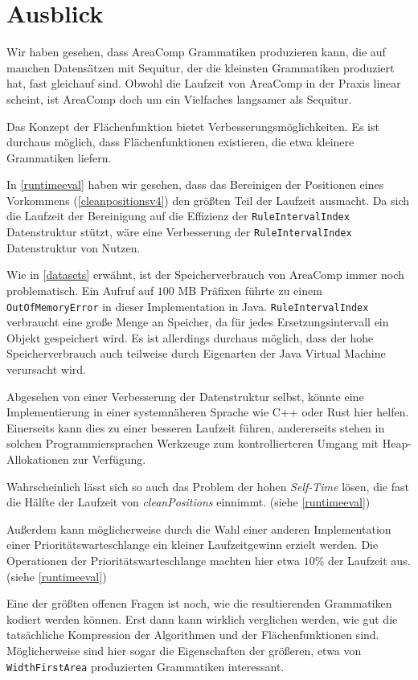 \chapter{Ausblick}
\label{ausblick}

Wir haben gesehen, dass AreaComp Grammatiken produzieren kann, die auf manchen Datensätzen mit Sequitur, der die kleinsten Grammatiken produziert hat, fast gleichauf sind. Obwohl die Laufzeit von AreaComp in der Praxis linear scheint, ist AreaComp doch um ein Vielfaches langsamer als Sequitur. 

Das Konzept der Flächenfunktion bietet Verbesserungsmöglichkeiten. Es ist durchaus möglich, dass Flächenfunktionen existieren, die etwa kleinere Grammatiken liefern. 

In \autoref{runtimeeval} haben wir gesehen, dass das Bereinigen der Positionen eines Vorkommens (\autoref{cleanpositionsv4}) den größten Teil der Laufzeit ausmacht. Da sich die Laufzeit der Bereinigung auf die Effizienz der \texttt{RuleIntervalIndex} Datenstruktur stützt, wäre eine Verbesserung der \texttt{RuleIntervalIndex} Datenstruktur von Nutzen.

Wie in \autoref{datasets} erwähnt, ist der Speicherverbrauch von AreaComp immer noch problematisch. Ein Aufruf auf $100$ MB Präfixen führte zu einem \texttt{OutOfMemoryError} in dieser Implementation in Java. 
\texttt{RuleIntervalIndex} verbraucht eine große Menge an Speicher, da für jedes Ersetzungsintervall ein Objekt gespeichert wird. 
Es ist allerdings durchaus möglich, dass der hohe Speicherverbrauch auch teilweise durch Eigenarten der Java Virtual Machine verursacht wird.

Abgesehen von einer Verbesserung der Datenstruktur selbst, könnte eine Implementierung in einer systemnäheren Sprache wie C++ oder Rust hier helfen.
Einerseits kann dies zu einer besseren Laufzeit führen, andererseits stehen in solchen Programmiersprachen Werkzeuge zum kontrollierteren Umgang mit Heap-Allokationen zur Verfügung.

Wahrscheinlich lässt sich so auch das Problem der hohen \emph{Self-Time} lösen, die fast die Hälfte der Laufzeit von \emph{cleanPositions} einnimmt. (siehe \autoref{runtimeeval})

Außerdem kann möglicherweise durch die Wahl einer anderen Implementation einer Prioritätswarteschlange ein kleiner Laufzeitgewinn erzielt werden. Die Operationen der Prioritätswarteschlange machten hier etwa $10$\% der Laufzeit aus. (siehe \autoref{runtimeeval})

Eine der größten offenen Fragen ist noch, wie die resultierenden Grammatiken kodiert werden können. Erst dann kann wirklich verglichen werden, wie gut die tatsächliche Kompression der Algorithmen und der Flächenfunktionen sind. Möglicherweise sind hier sogar die Eigenschaften der größeren, etwa von \texttt{WidthFirstArea} produzierten Grammatiken interessant. 
